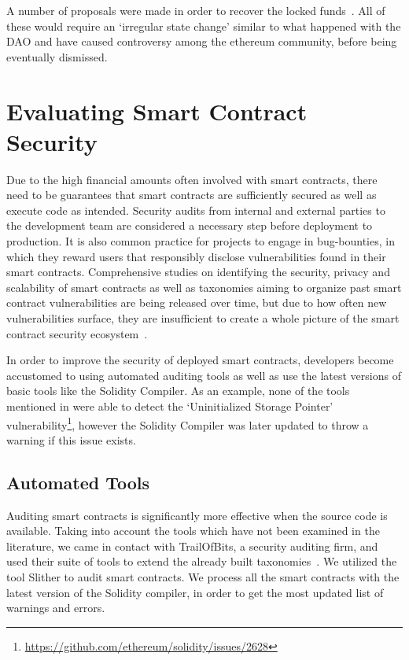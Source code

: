 A number of proposals were made in order to recover the locked funds~\cite{eip867, eip999}. All of these would require an `irregular state change' similar to what happened with the DAO and have caused controversy among the ethereum community, before being eventually dismissed.


\section{Evaluating Smart Contract Security}
Due to the high financial amounts often involved with smart contracts, there need to be guarantees that smart contracts are sufficiently secured as well as execute code as intended. Security audits from internal and external parties to the development team are considered a necessary step before deployment to production. It is also common practice for projects to engage in bug-bounties, in which they reward users that responsibly disclose vulnerabilities found in their smart contracts. Comprehensive studies on identifying the security, privacy and scalability of smart contracts as well as taxonomies aiming to organize past smart contract vulnerabilities are being released over time, but due to how often new vulnerabilities surface, they are insufficient to create a whole picture of the smart contract security ecosystem~\cite{DBLP:journals/corr/abs-1710-06372, Atzei:2017:SAE:3080353.3080363,tools}.

In order to improve the security of deployed smart contracts, developers become accustomed to using automated auditing tools as well as use the latest versions of basic tools like the Solidity Compiler. As an example, none of the tools mentioned in \cite{tools} were able to detect the `Uninitialized Storage Pointer' vulnerability\footnote{\url{https://github.com/ethereum/solidity/issues/2628}}, however the Solidity Compiler was later updated to throw a warning if this issue exists. 

\subsection{Automated Tools}\label{slither}

Auditing smart contracts is significantly more effective when the source code is available. Taking into account the tools which have not been examined in the literature, we came in contact with TrailOfBits, a security auditing firm, and used their suite of tools to extend the already built taxonomies~\cite{trailofbits}. We utilized the tool Slither to audit smart contracts. We process all the smart contracts with the latest version of the Solidity compiler, in order to get the most updated list of warnings and errors. 

